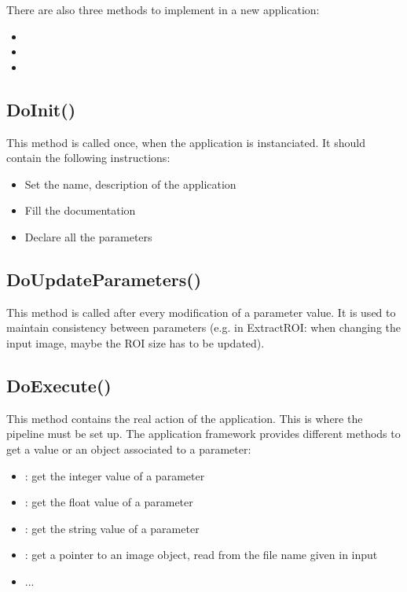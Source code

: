 There are also three methods to implement in a new application:
\begin{itemize}
  \item {}
  \item {}
  \item {}
\end{itemize}

\subsection{DoInit()}
\label{sec:appDoInit}
This method is called once, when the application is instanciated. It should 
contain the following instructions:
\begin{itemize}
  \item Set the name, description of the application
  \item Fill the documentation
  \item Declare all the parameters
\end{itemize}


\subsection{DoUpdateParameters()}
\label{sec:appDoUpdateParameters}
This method is called after every modification of a parameter value. It is used 
to maintain consistency between parameters (e.g. in ExtractROI: when changing the input image, maybe 
the ROI size has to be updated).

\subsection{DoExecute()}
\label{sec:appDoExecute}
This method contains the real action of the application. This is where the pipeline 
must be set up. The application framework provides different methods to get a value 
or an object associated to a parameter:
\begin{itemize}
  \item {} : get the integer value of a parameter
  \item {} : get the float value of a parameter
  \item {} : get the string value of a parameter
  \item {} : get a pointer to an image object, read from the
  file name given in input
  \item ...
\end{itemize}


